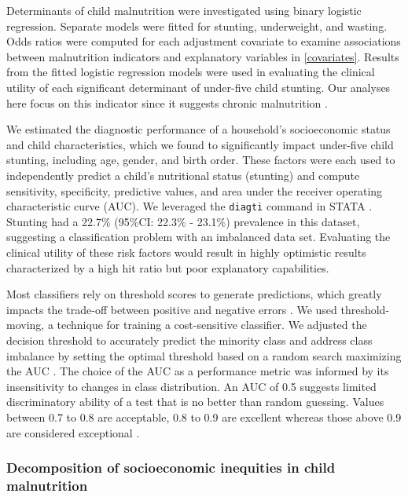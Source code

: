 \documentclass[sn-basic,Numbered,pdflatex]{sn-jnl}
\theoremstyle{remark}
\theoremstyle{definition}
\begin{document}
Determinants of child malnutrition were investigated using binary
logistic regression. Separate models were fitted for stunting,
underweight, and wasting. Odds ratios were computed for each adjustment
covariate to examine associations between malnutrition indicators and
explanatory variables in \ref{covariates}. Results from the fitted
logistic regression models were used in evaluating the clinical utility
of each significant determinant of under-five child stunting. Our
analyses here focus on this indicator since it suggests chronic
malnutrition \citep{jonah2018}.

We estimated the diagnostic performance of a household's socioeconomic
status and child characteristics, which we found to significantly impact
under-five child stunting, including age, gender, and birth order. These
factors were each used to independently predict a child's nutritional
status (stunting) and compute sensitivity, specificity, predictive
values, and area under the receiver operating characteristic curve
(AUC). We leveraged the \texttt{diagti} command in STATA
\citep{seed2010diagt}. Stunting had a 22.7\% (95\%CI: 22.3\% - 23.1\%)
prevalence in this dataset, suggesting a classification problem with an
imbalanced data set. Evaluating the clinical utility of these risk
factors would result in highly optimistic results characterized by a
high hit ratio but poor explanatory capabilities.

Most classifiers rely on threshold scores to generate predictions, which
greatly impacts the trade-off between positive and negative errors
\citep{provost2008machine}. We used threshold-moving, a technique for
training a cost-sensitive classifier. We adjusted the decision threshold
to accurately predict the minority class and address class imbalance by
setting the optimal threshold based on a random search maximizing the
AUC \citep{haibo2013imbalanced}. The choice of the AUC as a performance
metric was informed by its insensitivity to changes in class
distribution. An AUC of 0.5 suggests limited discriminatory ability of a
test that is no better than random guessing. Values between 0.7 to 0.8
are acceptable, 0.8 to 0.9 are excellent whereas those above 0.9 are
considered exceptional \citep{Fawcett2006, Mandrekar2010}.

\hypertarget{decompose}{%
\subsubsection{Decomposition of socioeconomic inequities in child
malnutrition}\label{decompose}}
\end{document}
